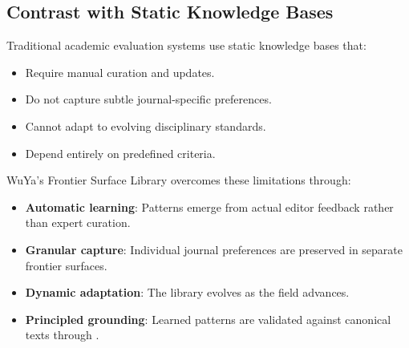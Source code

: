\subsection{Contrast with Static Knowledge Bases}

Traditional academic evaluation systems use static knowledge bases that:
\begin{itemize}
    \item Require manual curation and updates.
    \item Do not capture subtle journal-specific preferences.
    \item Cannot adapt to evolving disciplinary standards.
    \item Depend entirely on predefined criteria.
\end{itemize}

WuYa's Frontier Surface Library overcomes these limitations through:
\begin{itemize}
    \item \textbf{Automatic learning}: Patterns emerge from actual editor feedback rather than expert curation.
    \item \textbf{Granular capture}: Individual journal preferences are preserved in separate frontier surfaces.
    \item \textbf{Dynamic adaptation}: The library evolves as the field advances.
    \item \textbf{ Principled grounding}: Learned patterns are validated against canonical texts through \rag{}.
\end{itemize}
